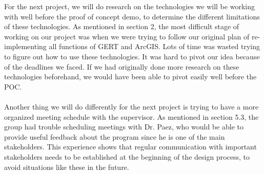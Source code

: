 \documentclass{article}
\begin{document}
For the next project, we will do research on the technologies we will be working with well before the proof of concept demo, to determine the different limitations of these technologies. As mentioned in section 2, the most difficult stage of working on our project was when we were trying to follow our original plan of re-implementing all functions of GERT and ArcGIS. Lots of time was wasted trying to figure out how to use these technologies. It was hard to pivot our idea because of the deadlines we faced. If we had originally done more research on these technologies beforehand, we would have been able to pivot easily well before the POC.
\\ \\ 
Another thing we will do differently for the next project is trying to have a more organized meeting schedule with the supervisor. As mentioned in section 5.3, the group had trouble scheduling meetings with Dr. Paez, who would be able to provide useful feedback about the program since he is one of the main stakeholders. This experience shows that regular communication with important stakeholders needs to be established at the beginning of the design process, to avoid situations like these in the future.
\end{document}
